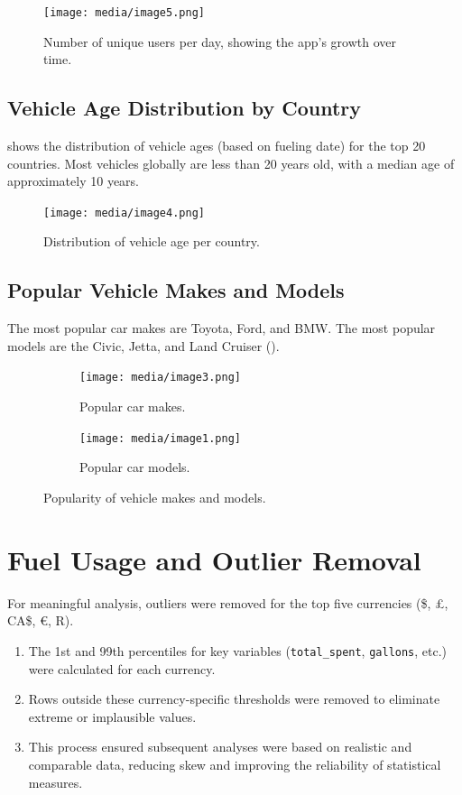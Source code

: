\documentclass{article}
\begin{document}
\begin{figure}[htbp]
    \centering
    \texttt{[image: media/image5.png]}
    \caption{Number of unique users per day, showing the app's growth over time.}
    \label{fig:users_per_day}
\end{figure}

\subsection{Vehicle Age Distribution by Country}
 shows the distribution of vehicle ages (based on fueling date) for the top 20 countries. Most vehicles globally are less than 20 years old, with a median age of approximately 10 years.

\begin{figure}[htbp]
    \centering
    \texttt{[image: media/image4.png]}
    \caption{Distribution of vehicle age per country.}
    \label{fig:vehicle_age}
\end{figure}

\subsection{Popular Vehicle Makes and Models}
The most popular car makes are Toyota, Ford, and BMW. The most popular models are the Civic, Jetta, and Land Cruiser ().

\begin{figure}[htbp]
    \centering
    \begin{subfigure}[b]{0.45\textwidth}
        \centering
        \texttt{[image: media/image3.png]}
        \caption{Popular car makes.}
    \end{subfigure}
    \hfill
    \begin{subfigure}[b]{0.45\textwidth}
        \centering
        \texttt{[image: media/image1.png]}
        \caption{Popular car models.}
    \end{subfigure}
    \caption{Popularity of vehicle makes and models.}
    \label{fig:pop_models}
\end{figure}

\section{Fuel Usage and Outlier Removal}
For meaningful analysis, outliers were removed for the top five currencies (\$, £, CA\$, €, R).
\begin{enumerate}
    \item The 1st and 99th percentiles for key variables (\texttt{total\_spent}, \texttt{gallons}, etc.) were calculated for each currency.
    \item Rows outside these currency-specific thresholds were removed to eliminate extreme or implausible values.
    \item This process ensured subsequent analyses were based on realistic and comparable data, reducing skew and improving the reliability of statistical measures.
\end{enumerate}
\end{document}
